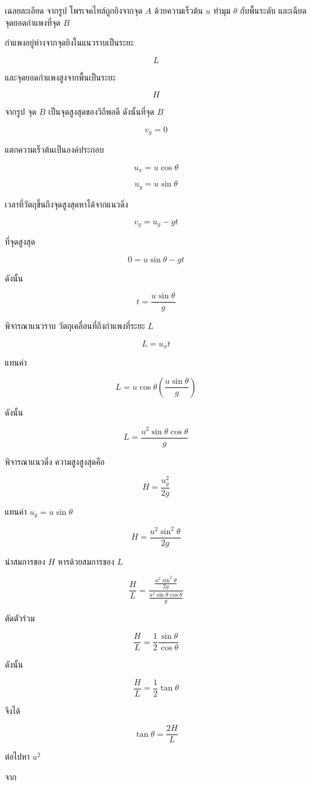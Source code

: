 \begin{examplebox}{เฉลยละเอียด}
จากรูป โพรเจคไทล์ถูกยิงจากจุด $A$ ด้วยความเร็วต้น $u$ ทำมุม $\theta$ กับพื้นระดับ และเฉียดจุดยอดกำแพงที่จุด $B$

กำแพงอยู่ห่างจากจุดยิงในแนวราบเป็นระยะ

\[
L
\]

และจุดยอดกำแพงสูงจากพื้นเป็นระยะ

\[
H
\]

จากรูป จุด $B$ เป็นจุดสูงสุดของวิถีพอดี ดังนั้นที่จุด $B$

\[
v_y=0
\]

แตกความเร็วต้นเป็นองค์ประกอบ

\[
u_x=u\cos\theta
\]

\[
u_y=u\sin\theta
\]

เวลาที่วัตถุขึ้นถึงจุดสูงสุดหาได้จากแนวดิ่ง

\[
v_y=u_y-gt
\]

ที่จุดสูงสุด

\[
0=u\sin\theta-gt
\]

ดังนั้น

\[
t=\frac{u\sin\theta}{g}
\]

พิจารณาแนวราบ วัตถุเคลื่อนที่ถึงกำแพงที่ระยะ $L$

\[
L=u_x t
\]

แทนค่า

\[
L=u\cos\theta\left(\frac{u\sin\theta}{g}\right)
\]

ดังนั้น

\[
L=\frac{u^2\sin\theta\cos\theta}{g}
\]

พิจารณาแนวดิ่ง ความสูงสูงสุดคือ

\[
H=\frac{u_y^2}{2g}
\]

แทนค่า $u_y=u\sin\theta$

\[
H=\frac{u^2\sin^2\theta}{2g}
\]

นำสมการของ $H$ หารด้วยสมการของ $L$

\[
\frac{H}{L}
=
\frac{\frac{u^2\sin^2\theta}{2g}}
{\frac{u^2\sin\theta\cos\theta}{g}}
\]

ตัดตัวร่วม

\[
\frac{H}{L}
=
\frac{1}{2}\frac{\sin\theta}{\cos\theta}
\]

ดังนั้น

\[
\frac{H}{L}=\frac{1}{2}\tan\theta
\]

จึงได้

\[
\boxed{\tan\theta=\frac{2H}{L}}
\]

ต่อไปหา $u^2$

จาก


\end{examplebox}
